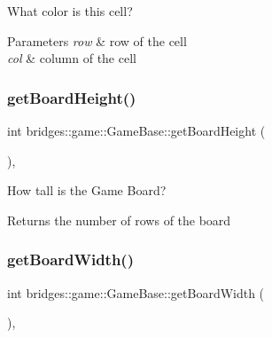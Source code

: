 What color is this cell? 


\begin{DoxyParams}{Parameters}
{\em row} & row of the cell \\
\hline
{\em col} & column of the cell \\
\hline
\end{DoxyParams}
\mbox{\label{classbridges_1_1game_1_1_game_base_a14510d6685e0b224c8995e397ad64adc}} 
\subsubsection{\texorpdfstring{get\+Board\+Height()}{getBoardHeight()}}
{\footnotesize\ttfamily int bridges\+::game\+::\+Game\+Base\+::get\+Board\+Height (\begin{DoxyParamCaption}{ }\end{DoxyParamCaption})\hspace{0.3cm}{\ttfamily [inline]}, {\ttfamily [protected]}}



How tall is the Game Board? 

\begin{DoxyReturn}{Returns}
the number of rows of the board 
\end{DoxyReturn}
\mbox{\label{classbridges_1_1game_1_1_game_base_ad74bf992cced25e9997fbf8a63bf8157}} 
\subsubsection{\texorpdfstring{get\+Board\+Width()}{getBoardWidth()}}
{\footnotesize\ttfamily int bridges\+::game\+::\+Game\+Base\+::get\+Board\+Width (\begin{DoxyParamCaption}{ }\end{DoxyParamCaption})\hspace{0.3cm}{\ttfamily [inline]}, {\ttfamily [protected]}}



